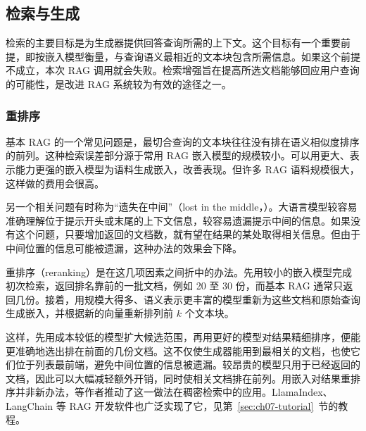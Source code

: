 \subsection{检索与生成}
\begin{keypoint}
检索的主要目标是为生成器提供回答查询所需的上下文。这个目标有一个重要前提，即按嵌入模型衡量，与查询语义最相近的文本块包含所需信息。如果这个前提不成立，本次 RAG 调用就会失败。检索增强旨在提高所选文档能够回应用户查询的可能性，是改进 RAG 系统较为有效的途径之一。
\end{keypoint}

\subsubsection{重排序}
\label{sec:ch07-reranking}
基本 RAG 的一个常见问题是，最切合查询的文本块往往没有排在语义相似度排序的前列。这种检索误差部分源于常用 RAG 嵌入模型的规模较小。可以用更大、表示能力更强的嵌入模型为语料生成嵌入，改善表现。但许多 RAG 语料规模很大，这样做的费用会很高。

另一个相关问题有时称为“遗失在中间”（lost in the middle，）。大语言模型较容易准确理解位于提示开头或末尾的上下文信息，较容易遗漏提示中间的信息。如果没有这个问题，只要增加返回的文档数，就有望在结果的某处取得相关信息。但由于中间位置的信息可能被遗漏，这种办法的效果会下降。

重排序（reranking）是在这几项因素之间折中的办法。先用较小的嵌入模型完成初次检索，返回排名靠前的一批文档，例如 20 至 30 份，而基本 RAG 通常只返回几份。接着，用规模大得多、语义表示更丰富的模型重新为这些文档和原始查询生成嵌入，并根据新的向量重新排列前 $k$ 个文本块。


这样，先用成本较低的模型扩大候选范围，再用更好的模型对结果精细排序，便能更准确地选出排在前面的几份文档。这不仅使生成器能用到最相关的文档，也使它们位于列表最前端，避免中间位置的信息被遗漏。较昂贵的模型只用于已经返回的文档，因此可以大幅减轻额外开销，同时使相关文档排在前列。用嵌入对结果重排序并非新办法，等作者推动了这一做法在稠密检索中的应用。LlamaIndex、LangChain 等 RAG 开发软件也广泛实现了它，见第~\ref{sec:ch07-tutorial}~节的教程。

